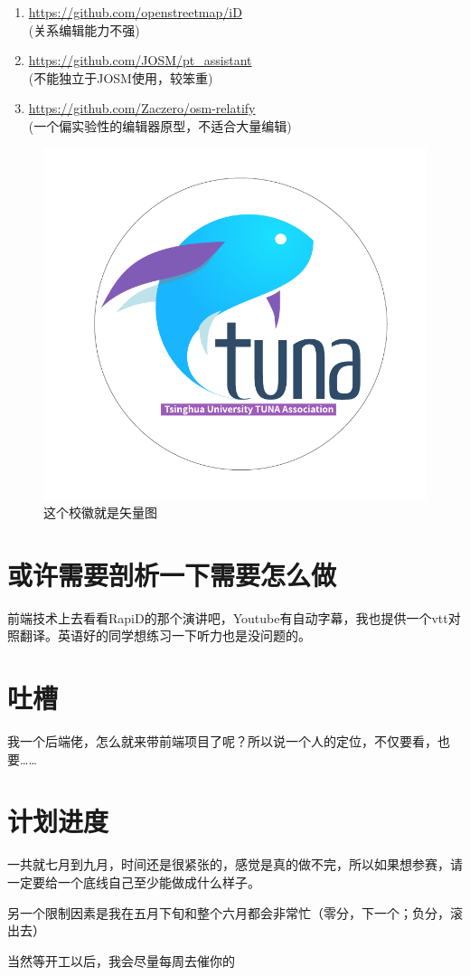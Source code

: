 \documentclass{beamer}
\begin{document}
\begin{frame}
    \begin{enumerate}
        \item \url{https://github.com/openstreetmap/iD} \\
        (关系编辑能力不强)
        \item \url{https://github.com/JOSM/pt_assistant} \\
        (不能独立于JOSM使用，较笨重)
        \item \url{https://github.com/Zaczero/osm-relatify} \\
        (一个偏实验性的编辑器原型，不适合大量编辑)
    \end{enumerate}
    \begin{figure}[htpb]
        \centering
        \includegraphics[width=0.2\linewidth]{figure/tuna.pdf}
        \caption{这个校徽就是矢量图}
    \end{figure}
\end{frame}

\section{或许需要剖析一下需要怎么做}

\begin{frame}
    前端技术上去看看RapiD的那个演讲吧，Youtube有自动字幕，我也提供一个vtt对照翻译。英语好的同学想练习一下听力也是没问题的。
\end{frame}

\section{吐槽}

\begin{frame}
    我一个后端佬，怎么就来带前端项目了呢？所以说一个人的定位，不仅要看，也要……
\end{frame}

\section{计划进度}
\begin{frame}
    一共就七月到九月，时间还是很紧张的，感觉是真的做不完，所以如果想参赛，请一定要给一个底线自己至少能做成什么样子。

    另一个限制因素是我在五月下旬和整个六月都会非常忙（零分，下一个；负分，滚出去）

    当然等开工以后，我会尽量每周去催你的
\end{frame}
\end{document}
